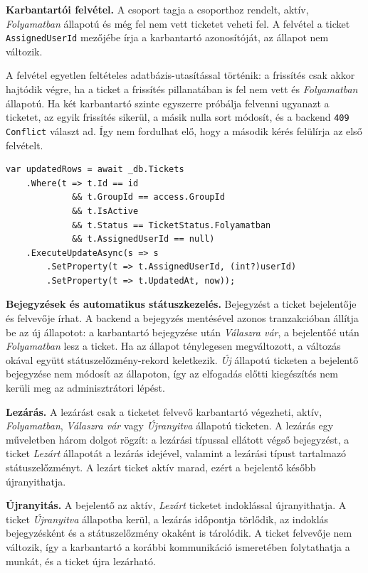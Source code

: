 \documentclass[12pt, a4paper, twoside]{article}
\begin{document}
\textbf{Karbantartói felvétel.} A csoport tagja a csoporthoz rendelt, aktív, \textit{Folyamatban} állapotú és még fel nem vett ticketet veheti fel. A felvétel a ticket \texttt{AssignedUserId} mezőjébe írja a karbantartó azonosítóját, az állapot nem változik.

A felvétel egyetlen feltételes adatbázis-utasítással történik: a frissítés csak akkor hajtódik végre, ha a ticket a frissítés pillanatában is fel nem vett és \textit{Folyamatban} állapotú. Ha két karbantartó szinte egyszerre próbálja felvenni ugyanazt a ticketet, az egyik frissítés sikerül, a másik nulla sort módosít, és a backend \texttt{409 Conflict} választ ad. Így nem fordulhat elő, hogy a második kérés felülírja az első felvételt.

\begin{verbatim}
var updatedRows = await _db.Tickets
    .Where(t => t.Id == id
             && t.GroupId == access.GroupId
             && t.IsActive
             && t.Status == TicketStatus.Folyamatban
             && t.AssignedUserId == null)
    .ExecuteUpdateAsync(s => s
        .SetProperty(t => t.AssignedUserId, (int?)userId)
        .SetProperty(t => t.UpdatedAt, now));
\end{verbatim}

\textbf{Bejegyzések és automatikus státuszkezelés.} Bejegyzést a ticket bejelentője és felvevője írhat. A backend a bejegyzés mentésével azonos tranzakcióban állítja be az új állapotot: a karbantartó bejegyzése után \textit{Válaszra vár}, a bejelentőé után \textit{Folyamatban} lesz a ticket. Ha az állapot ténylegesen megváltozott, a változás okával együtt státuszelőzmény-rekord keletkezik. \textit{Új} állapotú ticketen a bejelentő bejegyzése nem módosít az állapoton, így az elfogadás előtti kiegészítés nem kerüli meg az adminisztrátori lépést.

\textbf{Lezárás.} A lezárást csak a ticketet felvevő karbantartó végezheti, aktív, \textit{Folyamatban}, \textit{Válaszra vár} vagy \textit{Újranyitva} állapotú ticketen. A lezárás egy műveletben három dolgot rögzít: a lezárási típussal ellátott végső bejegyzést, a ticket \textit{Lezárt} állapotát a lezárás idejével, valamint a lezárási típust tartalmazó státuszelőzményt. A lezárt ticket aktív marad, ezért a bejelentő később újranyithatja.

\textbf{Újranyitás.} A bejelentő az aktív, \textit{Lezárt} ticketet indoklással újranyithatja. A ticket \textit{Újranyitva} állapotba kerül, a lezárás időpontja törlődik, az indoklás bejegyzésként és a státuszelőzmény okaként is tárolódik. A ticket felvevője nem változik, így a karbantartó a korábbi kommunikáció ismeretében folytathatja a munkát, és a ticket újra lezárható.
\end{document}
